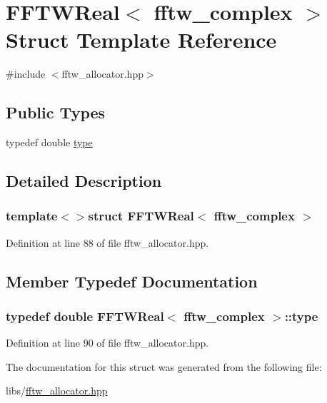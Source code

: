 \hypertarget{struct_f_f_t_w_real_3_01fftw__complex_01_4}{\section{F\-F\-T\-W\-Real$<$ fftw\-\_\-complex $>$ Struct Template Reference}
\label{struct_f_f_t_w_real_3_01fftw__complex_01_4}
}


{\ttfamily \#include $<$fftw\-\_\-allocator.\-hpp$>$}

\subsection*{Public Types}
\begin{DoxyCompactItemize}
\item 
typedef double \hyperlink{struct_f_f_t_w_real_3_01fftw__complex_01_4_a07bdd5013a037d018677b5a0fc9b9c9e}{type}
\end{DoxyCompactItemize}


\subsection{Detailed Description}
\subsubsection*{template$<$$>$struct F\-F\-T\-W\-Real$<$ fftw\-\_\-complex $>$}



Definition at line 88 of file fftw\-\_\-allocator.\-hpp.



\subsection{Member Typedef Documentation}
\hypertarget{struct_f_f_t_w_real_3_01fftw__complex_01_4_a07bdd5013a037d018677b5a0fc9b9c9e}{
\subsubsection[{type}]{\setlength{\rightskip}{0pt plus 5cm}typedef double {\bf F\-F\-T\-W\-Real}$<$ fftw\-\_\-complex $>$\-::{\bf type}}}\label{struct_f_f_t_w_real_3_01fftw__complex_01_4_a07bdd5013a037d018677b5a0fc9b9c9e}


Definition at line 90 of file fftw\-\_\-allocator.\-hpp.



The documentation for this struct was generated from the following file\-:\begin{DoxyCompactItemize}
\item 
libs/\hyperlink{fftw__allocator_8hpp}{fftw\-\_\-allocator.\-hpp}\end{DoxyCompactItemize}
